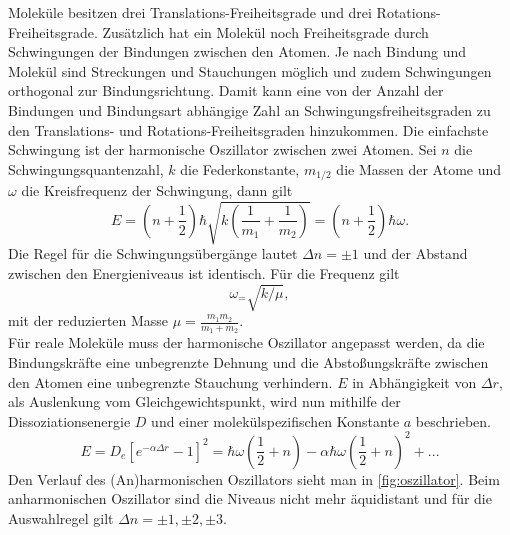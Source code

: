 \documentclass[.../bericht]{subfilies}
\begin{document}
    Moleküle besitzen drei Translations-Freiheitsgrade und drei Rotations-Freiheitsgrade. Zusätzlich hat ein Molekül noch Freiheitsgrade durch Schwingungen der Bindungen zwischen den Atomen. Je nach Bindung und Molekül sind Streckungen und Stauchungen möglich und zudem Schwingungen orthogonal zur Bindungsrichtung. Damit kann eine von der Anzahl der Bindungen und Bindungsart abhängige Zahl an Schwingungsfreiheitsgraden zu den Translations- und Rotations-Freiheitsgraden hinzukommen. Die einfachste Schwingung ist der harmonische Oszillator zwischen zwei Atomen. Sei $n$ die Schwingungsquantenzahl, $k$ die Federkonstante, $m_{1/2}$ die Massen der Atome und $\omega$ die Kreisfrequenz der Schwingung, dann gilt
    \begin{equation}
      E=(n+\frac{1}{2})\hbar \sqrt{k(\frac{1}{m_1}+\frac{1}{m_2})}=(n+\frac{1}{2})\hbar \omega.
      \label{eq:harmonischeroszi}
    \end{equation}
    Die Regel für die Schwingungsübergänge lautet $\Delta n= \pm 1$ und der Abstand zwischen den Energieniveaus ist identisch. Für die Frequenz gilt
    \begin{equation*}
      \omega_=\sqrt{k/\mu},
    \end{equation*}
    mit der reduzierten Masse $\mu=\frac{m_1m_2}{m_1+m_2}$.\\
    Für reale Moleküle muss der harmonische Oszillator angepasst werden, da die Bindungskräfte eine unbegrenzte Dehnung und die Abstoßungskräfte zwischen den Atomen eine unbegrenzte Stauchung verhindern. $E$ in Abhängigkeit von $\Delta r$, als Auslenkung vom Gleichgewichtspunkt, wird nun mithilfe der Dissoziationsenergie $D$ und einer molekülspezifischen Konstante $a$ beschrieben.
    \begin{equation}
      E=D_e[e^{-\alpha \Delta r}-1]^2=\hbar \omega(\frac{1}{2}+n)-\alpha \hbar \omega (\frac{1}{2}+n)^2+...
      \label{eq:anharmonischerosz}
    \end{equation}
    Den Verlauf des (An)harmonischen Oszillators sieht man in \cref{fig:oszillator}.
    Beim anharmonischen Oszillator sind die Niveaus nicht mehr äquidistant und für die Auswahlregel gilt $\Delta n= \pm 1, \pm 2, \pm 3$.\\
    \cite{schwingungsspek}
\end{document}
